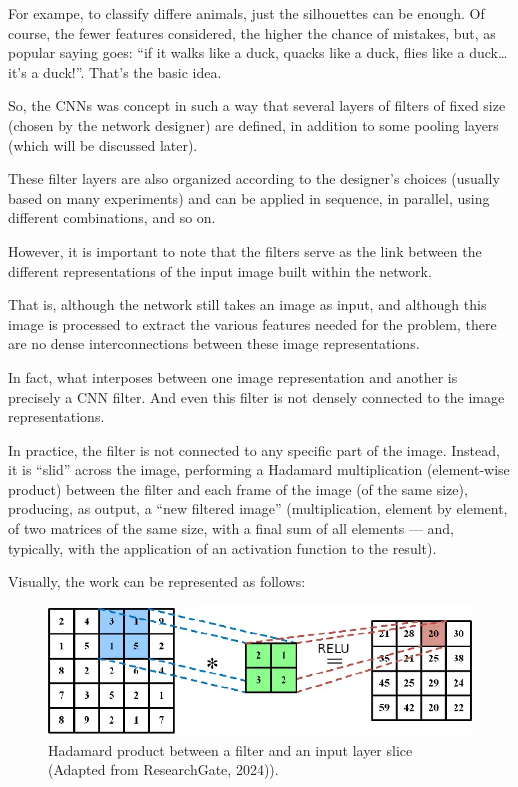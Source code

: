 \documentclass[sigconf,natbib=false]{acmart}
\begin{document}
For exampe, to classify differe animals, just the silhouettes can be enough. Of course, the fewer features considered, the higher the chance of mistakes, but, as popular saying goes: “if it walks like a duck, quacks like a duck, flies like a duck… it’s a duck!”. That’s the basic idea.

So, the CNNs was concept in such a way that several layers of filters of fixed size (chosen by the network designer) are defined, in addition to some pooling layers (which will be discussed later).

These filter layers are also organized according to the designer’s choices (usually based on many experiments) and can be applied in sequence, in parallel, using different combinations, and so on.

However, it is important to note that the filters serve as the link between the different representations of the input image built within the network.

That is, although the network still takes an image as input, and although this image is processed to extract the various features needed for the problem, there are no dense interconnections between these image representations.

In fact, what interposes between one image representation and another is precisely a CNN filter. And even this filter is not densely connected to the image representations.

In practice, the filter is not connected to any specific part of the image. Instead, it is “slid” across the image, performing a Hadamard multiplication (element-wise product) between the filter and each frame of the image (of the same size), producing, as output, a “new filtered image” (multiplication, element by element, of two matrices of the same size, with a final sum of all elements — and, typically, with the application of an activation function to the result).

Visually, the work can be represented as follows:

\begin{figure}[h]
 \centering
 \includegraphics[width=\linewidth]{figs/hadamard_product.png}
 \caption{Hadamard product between a filter and an input layer slice (Adapted from ResearchGate, 2024)).}
\end{figure}
\end{document}
